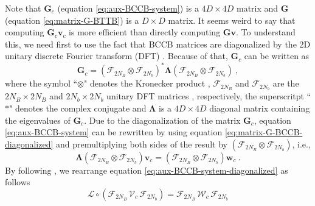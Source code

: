 Note that $\mathbf{G}_{c}$ (equation \ref{eq:aux-BCCB-system}) is a $4D \times 4D$ matrix and 
$\mathbf{G}$ (equation \ref{eq:matrix-G-BTTB}) is a $D \times D$ matrix.
It seems weird to say that computing $\mathbf{G}_{c} \mathbf{v}_{c}$ is more efficient
than directly computing $\mathbf{G} \mathbf{v}$. To understand this, we need first to use the fact that
BCCB matrices are diagonalized by the 2D unitary discrete Fourier transform (DFT) \citep[e.g.,][ p. 31]{davis1979}.
Because of that, $\mathbf{G}_{c}$ can be written as
\begin{equation}
	\mathbf{G}_{c} = 
	\left(\boldsymbol{\mathcal{F}}_{2N_{B}} \otimes \boldsymbol{\mathcal{F}}_{2N_{b}} \right)^{\ast} 
	\boldsymbol{\Lambda}
	\left(\boldsymbol{\mathcal{F}}_{2N_{B}} \otimes \boldsymbol{\mathcal{F}}_{2N_{b}} \right) \: ,
	\label{eq:matrix-G-BCCB-diagonalized}
\end{equation}
where the symbol ``$\otimes$" denotes the Kronecker product \cite[e.g.,][p. 243]{horn-johnson1991},
$\boldsymbol{\mathcal{F}}_{2N_{B}}$ and $\boldsymbol{\mathcal{F}}_{2N_{b}}$ are the $2N_{B} \times 2N_{B}$ and $2N_{b} \times 2N_{b}$ 
unitary DFT matrices \citep[e.g.,][ p. 31]{davis1979}, respectively, the superscritpt 
``$\ast$" denotes the complex conjugate and $\boldsymbol{\Lambda}$ is a 
$4D \times 4D$ diagonal matrix containing the eigenvalues of $\mathbf{G}_{c}$.
Due to the diagonalization of the matrix $\mathbf{G}_{c}$, 
equation \ref{eq:aux-BCCB-system} can be rewritten by using equation 
\ref{eq:matrix-G-BCCB-diagonalized} and premultiplying both sides of the result 
by $\left(\boldsymbol{\mathcal{F}}_{2N_{B}} \otimes \boldsymbol{\mathcal{F}}_{2N_{b}} \right)$, i.e.,
\begin{equation}
	\boldsymbol{\Lambda} \left(\boldsymbol{\mathcal{F}}_{2N_{B}} \otimes \boldsymbol{\mathcal{F}}_{2N_{b}} \right) 
	\mathbf{v}_{c} = \left(\boldsymbol{\mathcal{F}}_{2N_{B}} \otimes \boldsymbol{\mathcal{F}}_{2N_{b}} \right) 
	\mathbf{w}_{c} \: .
	\label{eq:aux-BCCB-system-diagonalized}
\end{equation}
By following \citet{takahashi-etal2020}, we rearrange equation \ref{eq:aux-BCCB-system-diagonalized} as follows
\begin{equation}
	\boldsymbol{\mathcal{L}} \circ 
	\left( \boldsymbol{\mathcal{F}}_{2N_{B}} \, \boldsymbol{\mathcal{V}}_{c} \, \boldsymbol{\mathcal{F}}_{2N_{b}} \right) = 
	\boldsymbol{\mathcal{F}}_{2N_{B}} \, \boldsymbol{\mathcal{W}}_{c} \, \boldsymbol{\mathcal{F}}_{2N_{b}}
	\label{eq:aux-BCCB-system-diagonalized-2}
\end{equation}
